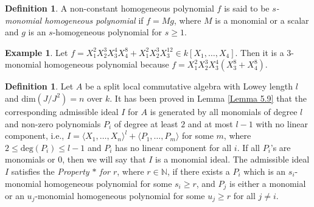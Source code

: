\documentclass[12pt]{amsart}
\theoremstyle{definition}
\newtheorem{definition}[theorem]{Definition}
\newtheorem{example}[theorem]{Example}
\numberwithin{equation}{section}
\begin{document}
\vskip4mm
\begin{definition}\label{Definition 5.22}
A non-constant homogeneous polynomial $f$ is said to be \emph{$s$-monomial homogeneous polynomial} if $f=Mg$, where $M$ is a monomial or a scalar and $g$ is an $s$-homogeneous polynomial for $s\geq 1$.
\end{definition}
\vskip4mm
\begin{example}\label{Example 5.23}
Let $f=X_1^2X_2^3X_3^4 X_4^8+X_1^2X_2^3X_3^{12}\in k[X_1,\dots,X_4]$. Then it is a $3$-monomial homogeneous polynomial because $f=X_1^2X_2^3X_3^4(X_3^8+X_4^8)$.
\end{example}
\vskip4mm
\begin{definition}\label{Definition 5.24}
Let $A$ be a split local commutative algebra with Lowey length $l$ and $\text{dim}(J/J^2)=n$ over $k$. It has been proved in Lemma \ref{Lemma 5.9} that the corresponding admissible ideal $I$ for $A$ is generated by all monomials of degree $l$ and non-zero polynomials $P_i$ of degree at least $2$ and at most $l-1$ with no linear component, i.e., $I=\langle X_1,\dots,X_n\rangle^l+\langle P_1,\dots, P_m\rangle$ for some $m$, where $2\leq \text{deg}(P_i)\leq l-1$ and $P_i$ has no linear component for all $i$. If all $P_i$'s are monomials or $0$, then we will say that $I$ is a monomial ideal. The admissible ideal $I$ satisfies the \emph{Property $*$ for $r$}, where $r\in \mathbb{N}$, if there exists a $P_i$ which is an $s_i$-monomial homogeneous polynomial for some $s_i\geq r$, and $P_j$ is either a monomial or an $u_j$-monomial homogeneous polynomial for some $ u_j\geq r$ for all $j\neq i$.
\end{definition}

\vskip4mm
\end{document}
